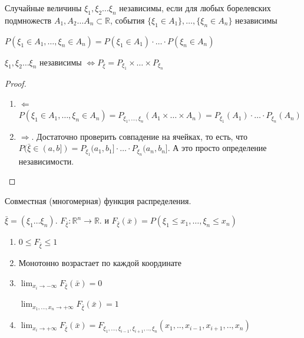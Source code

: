 \begin{definition}
    Случайные величины $\xi_1, \xi_2 \ldots \xi_n$ независимы, если для любых
    борелевских подмножеств $A_1, A_2 \ldots A_n \subset \mathbb{R}$, события
    $\{ \xi_1 \in A_1 \}, \ldots, \{ \xi_n \in A_n \}$ независимы

    \begin{remark}
        $P(\xi_1 \in A_1, \ldots, \xi_n \in A_n) = P(\xi_1 \in A_1) \cdot \ldots \cdot P(\xi_n \in A_n)$
    \end{remark}
\end{definition}

\begin{theorem}
    $\xi_1, \xi_2 \ldots \xi_n$ независимы $\Longleftrightarrow P_{\bar{\xi}} = P_{\xi_1} \times \ldots \times P_{\xi_n}$
\end{theorem}

\begin{proof}
    \begin{enumerate}
        \item $\Leftarrow$ $P(\xi_1 \in A_1, \ldots, \xi_n \in A_n) = P_{\xi_1, \ldots, \xi_n} (A_1 \times \ldots \times A_n) = P_{\xi_1} (A_1) \cdot \ldots \cdot P_{\xi_n} (A_n)$
        \item {
            $\Rightarrow$. Достаточно проверить совпадение на ячейках, то есть, что $P(\bar{\xi} \in (a, b]) = P_{\xi_1} (a_1, b_1] \cdot
            \ldots \cdot P_{\xi_n} (a_n, b_n]$. А это просто определение независимости.
        }
    \end{enumerate}
\end{proof}

\begin{definition}
    Совместная (многомерная) функция распределения.

    $\bar{\xi} = (\xi_1 \ldots \xi_n)$. $F_{\bar{\xi}} : \mathbb{R}^n \to \mathbb{R}$. и
    $F_{\bar{\xi}} (\bar{x}) = P(\xi_1 \leqslant x_1,  \ldots, \xi_n \leqslant x_n) $
\end{definition}

\begin{properties}
    \begin{enumerate}
        \item {
            $0 \leqslant F_{\bar{\xi}} \leqslant 1$
        }
        \item {
            Монотонно возрастает по каждой координате
        }
        \item {
            $\lim_{x_i \to -\infty} F_{\bar{\xi}} (\bar{x}) = 0$

            $\lim_{x_1, \ldots, x_n \to +\infty} F_{\bar{\xi}} (\bar{x}) = 1$
        }
        \item {
            $\lim_{x_i \to +\infty} F_{\bar{\xi}} (\bar{x}) = F_{\xi_1, \ldots, \xi_{i - 1}, \xi_{i + 1}, .., \xi_n}(x_1, .., x_{i-1}, x_{i+1}, .., x_n)$
        }
    \end{enumerate}
\end{properties}

